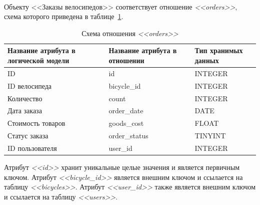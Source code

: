 \paragraph{}
Объекту <<Заказы велосипедов>> соответствует отношение \textit{<<orders>>},
схема которого приведена в таблице~\ref{tbl:orders_scheme}.
\begin{table}[h!]
  \caption{Схема отношения \textit{<<orders>>}}
  \label{tbl:orders_scheme}
  \small{
    \centering
    \begin{tabular}{| p{} | p{} | p{} |}
      \hline
      Название атрибута в \newline логической модели &
      Название атрибута в \newline отношении &
      Тип хранимых данных \\

      \hline
      ID & id & INTEGER \\

      \hline
      ID велосипеда & bicycle\_id & INTEGER \\

      \hline
      Количество & count & INTEGER \\

      \hline
      Дата заказа & order\_date & DATE \\

      \hline
      Стоимость товаров & goods\_cost & FLOAT \\

      \hline
      Статус заказа & order\_status & TINYINT \\

      \hline
      ID пользователя & user\_id & INTEGER \\

      \hline
    \end{tabular}
  }
\end{table}

Атрибут \textit{<<id>>} хранит уникальные целые значения и является первичным ключом.
Атрибут \textit{<<bicycle\_id>>} является внешним ключом
и ссылается на таблицу \textit{<<bicycles>>}.
Атрибут \textit{<<user\_id>>} также является внешним ключом и ссылается
на таблицу \textit{<<users>>}.


